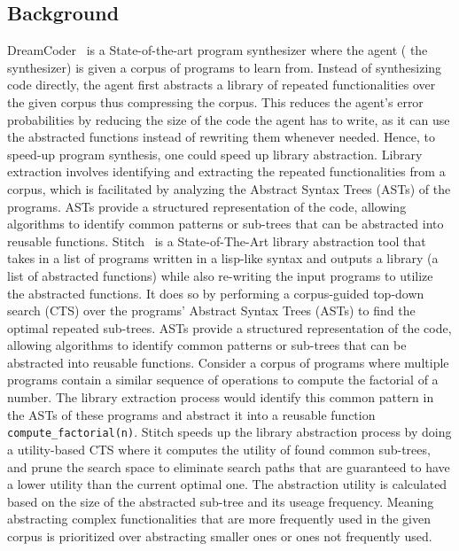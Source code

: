 \subsection{Background}
DreamCoder~\cite{ellis2020dreamcoder} is a State-of-the-art program synthesizer where the agent ( the synthesizer) is given a corpus of programs to learn from. Instead of synthesizing code directly, the agent first abstracts a library of repeated functionalities over the given corpus thus compressing the corpus. This reduces the agent's error probabilities by reducing the size of the code the agent has to write, as it can use the abstracted functions instead of rewriting them whenever needed. Hence, to speed-up program synthesis, one could speed up library abstraction. Library extraction involves identifying and extracting the repeated functionalities from a corpus, which is facilitated by analyzing the Abstract Syntax Trees (ASTs) of the programs. ASTs provide a structured representation of the code, allowing algorithms to identify common patterns or sub-trees that can be abstracted into reusable functions. Stitch~\cite{Bowers_2023stitch} is a State-of-The-Art library abstraction tool that takes in a list of programs written in a lisp-like syntax and outputs a library (a list of abstracted functions) while also re-writing the input programs to utilize the abstracted functions. It does so by performing a corpus-guided top-down search (CTS) over the programs' Abstract Syntax Trees (ASTs) to find the optimal repeated sub-trees. ASTs provide a structured representation of the code, allowing algorithms to identify common patterns or sub-trees that can be abstracted into reusable functions. Consider a corpus of programs where multiple programs contain a similar sequence of operations to compute the factorial of a number. The library extraction process would identify this common pattern in the ASTs of these programs and abstract it into a reusable function \texttt{compute\_factorial(n)}. Stitch speeds up the library abstraction process by doing a utility-based CTS where it computes the utility of found common sub-trees, and prune the search space to eliminate search paths that are guaranteed to have a lower utility than the current optimal one. The abstraction utility is calculated based on the size of the abstracted sub-tree and its useage frequency. Meaning abstracting complex functionalities that are more frequently used in the given corpus is prioritized over abstracting smaller ones or ones not frequently used. 

